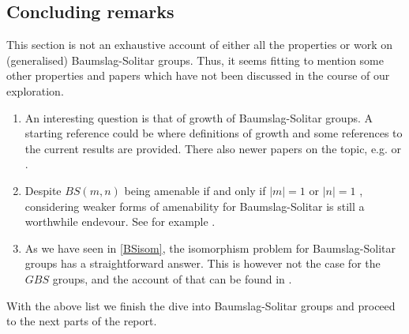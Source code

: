 \subsection{Concluding remarks}
This section is not an exhaustive account of either all the properties or work on (generalised) Baumslag-Solitar groups. Thus, it seems fitting to mention some other properties and papers which have not been discussed in the course of our exploration.
\begin{enumerate}
    \item An interesting question is that of growth of Baumslag-Solitar groups. A starting reference could be \cite{Ha00} where definitions of growth and some references to the current results are provided. There also newer papers on the topic, e.g. \cite{SaSh18} or \cite{FrKnSch11}.
    \item Despite $BS(m,n)$ being amenable if and only if $|m| = 1$ or $|n| = 1$ \cite{CaGaMaSt24}, considering weaker forms of amenability for Baumslag-Solitar is still a worthwhile endevour. See for example \cite{CoVa15}.
    \item As we have seen in \ref{BSisom}, the isomorphism problem for Baumslag-Solitar groups has a straightforward answer. This is however not the case for the $GBS$ groups, and the account of that can be found in \cite{ClFo08}.
\end{enumerate}

With the above list we finish the dive into Baumslag-Solitar groups and proceed to the next parts of the report.


